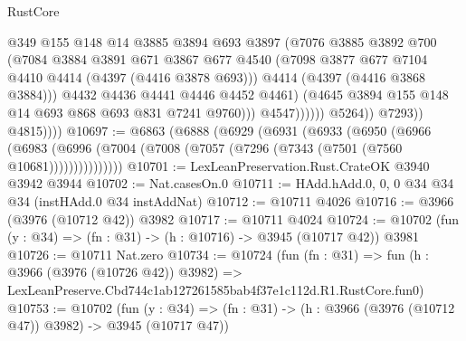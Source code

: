 \begin{lexlean}{RustCore}
\begin{coremodule}
                                    @349
                                    @155
                                    @148
                                    @14
                                    @3885
                                    @3894
                                    @693
                                    @3897
                                    (@7076
                                      @3885
                                      @3892
                                      @700
                                      (@7084
                                        @3884
                                        @3891
                                        @671
                                        @3867
                                        @677
                                        @4540
                                        (@7098
                                          @3877
                                          @677
                                          @7104
                                          @4410
                                          @4414
                                          (@4397 (@4416 @3878 @693)))
                                        @4414
                                        (@4397 (@4416 @3868 @3884)))
                                      @4432
                                      @4436
                                      @4441
                                      @4446
                                      @4452
                                      @4461)
                                    (@4645 @3894 @155 @148 @14 @693 @868 @693 @831 @7241 @9760)))
                                @4547))))))
                    @5264))
                @7293))
            @4815))))
@10697 := @6863
    (@6888
      (@6929
        (@6931
          (@6933
            (@6950
              (@6966
                (@6983 (@6996 (@7004 (@7008 (@7057 (@7296 (@7343 (@7501 (@7560 @10681)))))))))))))))
@10701 := LexLeanPreservation.Rust.CrateOK @3940 @3942 @3944
@10702 := Nat.casesOn.{0}
@10711 := HAdd.hAdd.{0, 0, 0} @34 @34 @34 (instHAdd.{0} @34 instAddNat)
@10712 := @10711 @4026
@10716 := @3966 (@3976 (@10712 @42)) @3982
@10717 := @10711 @4024
@10724 := @10702 (fun (y : @34) => (fn : @31) -> (h : @10716) -> @3945 (@10717 @42)) @3981
@10726 := @10711 Nat.zero
@10734 := @10724
    (fun (fn : @31) =>
    fun (h : @3966 (@3976 (@10726 @42)) @3982) =>
    LexLeanPreserve.Cbd744c1ab127261585bab4f37e1c112d.R1.RustCore.fun0)
@10753 := @10702
    (fun (y : @34) => (fn : @31) -> (h : @3966 (@3976 (@10712 @47)) @3982) -> @3945 (@10717 @47))

\end{coremodule}
\end{lexlean}
